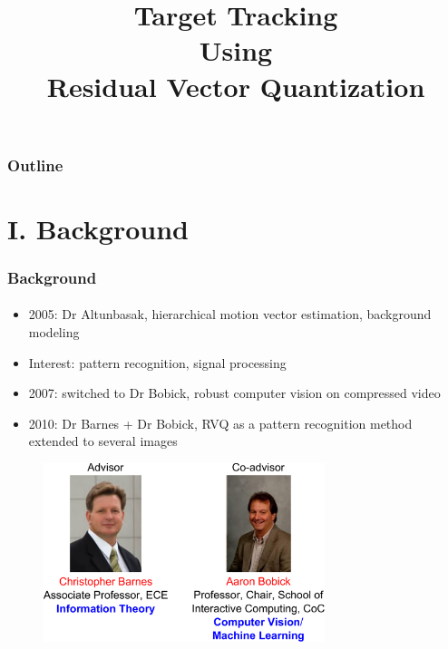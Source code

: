 

\title{Target Tracking \\ Using \\Residual Vector Quantization}
\begin{frame}[plain]\logoCSIPCPL\logoTechTower
	\titlepage
\end{frame}

\begin{frame}
\frametitle{Outline}
\logoCSIPCPL\logoTechTower
	\setcounter{tocdepth}{1}	
	\tableofcontents
\end{frame}

\section{I. Background}
\begin{frame}
\frametitle{Background}
\framesubtitle{}
\logoCSIPCPL\mypagenum
\vspace{0.2in}
\begin{itemize}
\item 2005: Dr Altunbasak, hierarchical motion vector estimation, background modeling
\item {\color{blue}Interest}: pattern recognition, signal processing
\item 2007: switched to Dr Bobick, robust computer vision on compressed video
\item 2010: Dr Barnes + Dr Bobick, RVQ as a pattern recognition method extended to several images
\end{itemize}
\begin{figure}
\includegraphics[width=0.73\textwidth]{thesis/professors.pdf}
\end{figure}
\end{frame}


